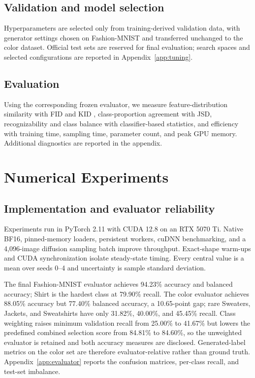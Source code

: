 \documentclass{article}
\begin{document}
\subsection{Validation and model selection}
Hyperparameters are selected only from training-derived validation data, with generator settings chosen on Fashion-MNIST and transferred unchanged to the color dataset. Official test sets are reserved for final evaluation; search spaces and selected configurations are reported in Appendix~\ref{app:tuning}.

\subsection{Evaluation}
Using the corresponding frozen evaluator, we measure feature-distribution similarity with FID \citep{heusel2017fid} and KID \citep{binkowski2018kid}, class-proportion agreement with JSD, recognizability and class balance with classifier-based statistics, and efficiency with training time, sampling time, parameter count, and peak GPU memory. Additional diagnostics are reported in the appendix.


\section{Numerical Experiments}
\subsection{Implementation and evaluator reliability}
Experiments run in PyTorch 2.11 with CUDA 12.8 on an RTX 5070 Ti. Native BF16, pinned-memory loaders, persistent workers, cuDNN benchmarking, and a 4,096-image diffusion sampling batch improve throughput. Exact-shape warm-ups and CUDA synchronization isolate steady-state timing. Every central value is a mean over seeds 0--4 and uncertainty is sample standard deviation.

The final Fashion-MNIST evaluator achieves 94.23\% accuracy and balanced accuracy; Shirt is the hardest class at 79.90\% recall. The color evaluator achieves 88.05\% accuracy but 77.40\% balanced accuracy, a 10.65-point gap; rare Sweaters, Jackets, and Sweatshirts have only 31.82\%, 40.00\%, and 45.45\% recall. Class weighting raises minimum validation recall from 25.00\% to 41.67\% but lowers the predefined combined selection score from 84.81\% to 84.60\%, so the unweighted evaluator is retained and both accuracy measures are disclosed. Generated-label metrics on the color set are therefore evaluator-relative rather than ground truth. Appendix~\ref{app:evaluator} reports the confusion matrices, per-class recall, and test-set imbalance.
\end{document}

